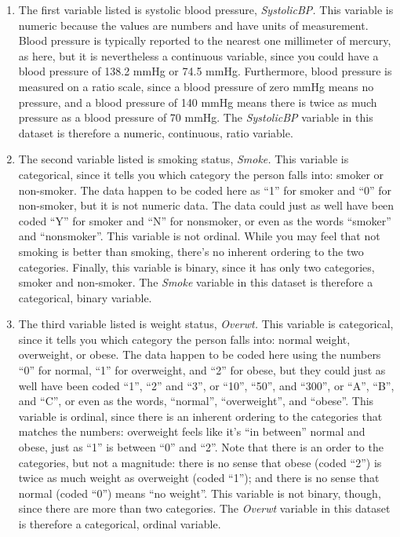 \documentclass[
]{book}
\begin{document}
\begin{enumerate}
\def\labelenumi{\arabic{enumi}.}
\item
  The first variable listed is systolic blood pressure, \emph{SystolicBP.} This variable is numeric because the values are numbers and have units of measurement. Blood pressure is typically reported to the nearest one millimeter of mercury, as here, but it is nevertheless a continuous variable, since you could have a blood pressure of 138.2 mmHg or 74.5 mmHg. Furthermore, blood pressure is measured on a ratio scale, since a blood pressure of zero mmHg means no pressure, and a blood pressure of 140 mmHg means there is twice as much pressure as a blood pressure of 70 mmHg. The \emph{SystolicBP} variable in this dataset is therefore a numeric, continuous, ratio variable.
\item
  The second variable listed is smoking status, \emph{Smoke.} This variable is categorical, since it tells you which category the person falls into: smoker or non-smoker. The data happen to be coded here as ``1'' for smoker and ``0'' for non-smoker, but it is not numeric data. The data could just as well have been coded ``Y'' for smoker and ``N'' for nonsmoker, or even as the words ``smoker'' and ``nonsmoker''. This variable is not ordinal. While you may feel that not smoking is better than smoking, there's no inherent ordering to the two categories. Finally, this variable is binary, since it has only two categories, smoker and non-smoker. The \emph{Smoke} variable in this dataset is therefore a categorical, binary variable.
\item
  The third variable listed is weight status, \emph{Overwt.} This variable is categorical, since it tells you which category the person falls into: normal weight, overweight, or obese. The data happen to be coded here using the numbers ``0'' for normal, ``1'' for overweight, and ``2'' for obese, but they could just as well have been coded ``1'', ``2'' and ``3'', or ``10'', ``50'', and ``300'', or ``A'', ``B'', and ``C'', or even as the words, ``normal'', ``overweight'', and ``obese''. This variable is ordinal, since there is an inherent ordering to the categories that matches the numbers: overweight feels like it's ``in between'' normal and obese, just as ``1'' is between ``0'' and ``2''. Note that there is an order to the categories, but not a magnitude: there is no sense that obese (coded ``2'') is twice as much weight as overweight (coded ``1''); and there is no sense that normal (coded ``0'') means ``no weight''. This variable is not binary, though, since there are more than two categories. The \emph{Overwt} variable in this dataset is therefore a categorical, ordinal variable.
\end{enumerate}
\end{document}
